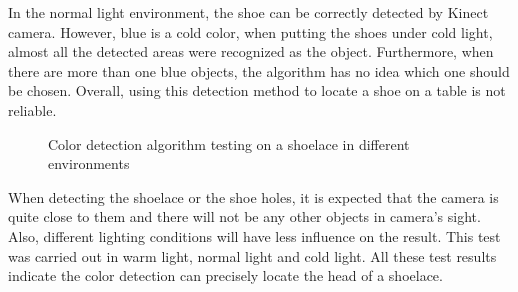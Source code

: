In the normal light environment, the shoe can be correctly detected by Kinect camera. However, blue is a cold color, when putting the shoes under cold light, almost all the detected areas were recognized as the object. Furthermore, when there are more than one blue objects, the algorithm has no idea which one should be chosen. Overall, using this detection method to locate a shoe on a table is not reliable.
\begin{figure}[H]
\centering
%
%
%
\caption{Color detection algorithm testing on a shoelace in different environments}%
\label{}%
\end{figure}
When detecting the shoelace or the shoe holes, it is expected that the camera is quite close to them and there will not be any other objects in camera's sight. Also, different lighting conditions will have less influence on the result. This test was carried out in warm light, normal light and cold light. All these test results indicate the color detection can precisely locate the head of a shoelace. 

